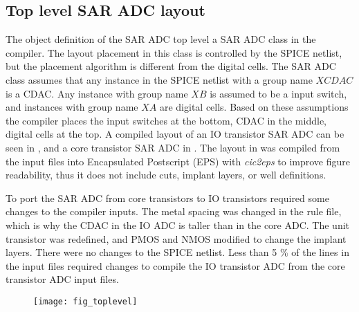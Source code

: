 \subsection{Top level SAR ADC layout} \label{overallayout}
The object definition of the SAR ADC top level  a SAR ADC class in
the compiler. The layout placement in this class is controlled
by the SPICE netlist, but the placement algorithm is different from
the digital cells. The SAR ADC class assumes that any
instance in the SPICE netlist with a group name $XCDAC$ is a CDAC. Any instance with group name $XB$ is assumed to
be a input switch, and instances with group name $XA$ are digital
cells. Based on these assumptions the compiler places the input switches at the
bottom, CDAC in the middle, digital cells at the top.
A compiled layout of an IO transistor SAR ADC can be seen in
, and a core transistor SAR ADC in
. The layout in  was compiled from the
input files into Encapsulated Postscript (EPS)\cite{eps92} with \textit{cic2eps}
\cite{ciccreator16} to improve figure readability, thus it does not
include cuts, implant layers, or well definitions.

To port the SAR ADC from core transistors to IO transistors
required some changes to the compiler inputs. The
metal spacing was changed in the rule file, which is why the CDAC in
the IO ADC is taller than in the core ADC. The unit transistor was redefined,  and PMOS and NMOS
 modified to change the implant layers. There were no changes to
the SPICE netlist. Less than 5 \% of the lines in the input files required
changes to compile the IO transistor ADC from the core transistor ADC
input files.



\begin{figure}[t]
\centerline{\texttt{[image: fig\_toplevel]}}
\caption[Caption without FN]{}
\label{fig_toplevel}
\end{figure}




